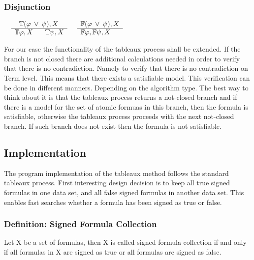 \documentclass{article}
\begin{document}
		\subsubsection*{Disjunction}
			$\begin{array}{rl}
				& \:\:\: \mathbb{T}(\varphi \: \vee \: \psi), X \\
			      \cline{2-2}
			      & \mathbb{T}\varphi, X \:\:\:\:\:\:\:\: \mathbb{T}\psi, X
			\end{array}$
			\:\:\:\:\:\:\:\:\:\:\:\:\:\:\:\:\:\:\:\:\:\:\:\:\:\:\:\:\:\:\:\:
			$\begin{array}{rl}
				& \mathbb{F}(\varphi \: \vee \: \psi), X \\
			      \cline{2-2}
			      & \mathbb{F}\varphi, \mathbb{F}\psi, X
			\end{array}$

	\newpage
	For our case the functionality of the tableaux process shall be extended. If the branch is not closed there are additional calculations needed in order to verify that there is no contradiction. Namely to verify that there is no contradiction on Term level. This means that there exists a satisfiable model.
	This verification can be done in different manners. Depending on the algorithm type. The best way to think about it is that the tableaux process returns a not-closed branch and if there is a model for the set of atomic formuas in this branch, then the formula is satisfiable, otherwise the tableaux process proceeds with the next not-closed branch. If such branch does not exist then the formula is not satisfiable. 

	\subsection{Implementation}
	The program implementation of the tableaux method follows the standard tableaux process. First interesting design decision is to keep all true signed formulas in one data set, and all false signed formulas in another data set. This enables fast searches whether a formula has been signed as true or false.

	\subsubsection*{Definition: Signed Formula Collection}
	Let X be a set of formulas, then X is called signed formula collection if and only if all formulas in X are signed as true or all formulas are signed as false.
\end{document}
